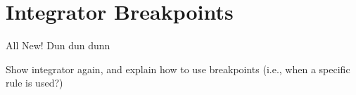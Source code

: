 \newpage
\section{Integrator Breakpoints}
\genHeader

All New! Dun dun dunn

Show integrator again, and explain how to use breakpoints (i.e., when a specific rule is used?)
